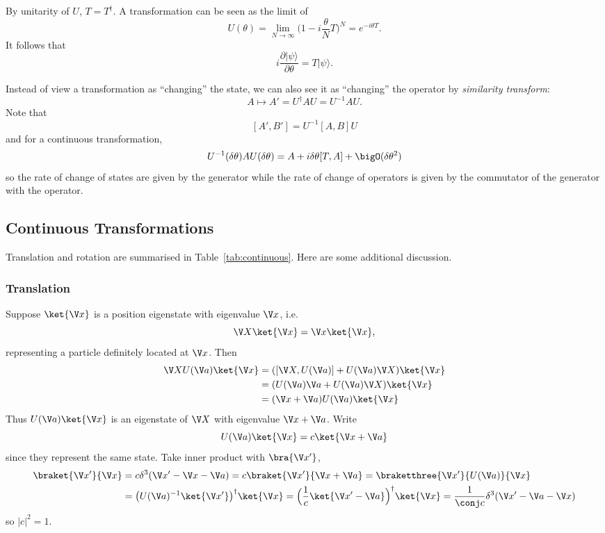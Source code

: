 \documentclass[a4paper]{article}
\newcommand*{\bk}{\braket}
\newcommand*{\bkt}{\braketthree}
\theoremstyle{definition}
\begin{document}
By unitarity of \(U\), \(T=T^\dag\). A transformation can be seen as the limit of
\[
  U(\theta) = \lim_{N\to \infty}\Big( 1- i \frac{\theta}{N}T \Big)^N = e^{-i\theta T}.
\]
It follows that
\[
  i \frac{\partial |\psi\rangle}{\partial \theta} = T |\psi\rangle.
\]

Instead of view a transformation as ``changing'' the state, we can also see it as ``changing'' the operator by \emph{similarity transform}:
\[
  A \mapsto A' = U^\dag A U = U^{-1} A U.
\]
Note that
\[
  [A',B'] = U^{-1}[A,B]U
\]
and for a continuous transformation,
\[
  U^{-1}(\delta\theta) A U(\delta\theta) = A + i\delta\theta [T,A] + \bigO(\delta\theta^2)
\]
so the rate of change of states are given by the generator while the rate of change of operators is given by the commutator of the generator with the operator.

\subsection{Continuous Transformations}

Translation and rotation are summarised in Table~\ref{tab:continuous}. Here are some additional discussion.

\subsubsection{Translation}

Suppose \(\ket{\V x}\) is a position eigenstate with eigenvalue \(\V x\), i.e.
\[
  \V X\ket{\V x} = \V x\ket{\V x},
\]
representing a particle definitely located at \(\V x\). Then
\begin{align*}
  \V X U(\V a)\ket{\V x} &= ([\V X,U(\V a)]+U(\V a) \V X)\ket{\V x} \\
                         &= (U(\V a)\V a + U(\V a)\V X)\ket{\V x} \\
                         &= (\V x+ \V a)U(\V a)\ket{\V x}
\end{align*}
Thus \(U(\V a)\ket{\V x}\) is an eigenstate of \(\V X\) with eigenvalue \(\V x+ \V a\). Write
\[
  U(\V a)\ket{\V x} = c\ket{\V x+ \V a}
\]
since they represent the same state. Take inner product with \(\bra{\V x'}\),
\begin{align*}
  \bk{\V x'}{\V x} &= c \delta^3(\V x'-\V x-\V a) = c \bk{\V x'}{\V x+ \V a} = \bkt{\V x'}{U(\V a)}{\V x} \\
                  &= \big( U(\V a)^{-1}\ket{\V x'} \big)^\dag \ket{\V x} = \Big( \frac{1}{c}\ket{\V x'-\V a} \Big)^\dag \ket{\V x} = \frac{1}{\conj c}\delta^3(\V x'- \V a - \V x)
\end{align*}
so \(|c|^2=1\).
\end{document}
